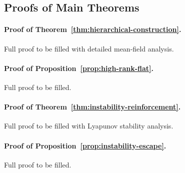 \subsection{Proofs of Main Theorems}

\paragraph{Proof of Theorem~\ref{thm:hierarchical-construction}.}
Full proof to be filled with detailed mean-field analysis.

\paragraph{Proof of Proposition~\ref{prop:high-rank-flat}.}
Full proof to be filled.

\paragraph{Proof of Theorem~\ref{thm:instability-reinforcement}.}
Full proof to be filled with Lyapunov stability analysis.

\paragraph{Proof of Proposition~\ref{prop:instability-escape}.}
Full proof to be filled.

